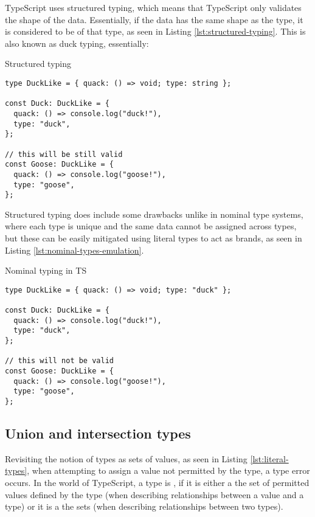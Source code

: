 TypeScript uses structured typing, which means that TypeScript only validates the shape of the data. Essentially, if the data has the same shape as the type, it is considered to be of that type, as seen in Listing \ref{lst:structured-typing}. This is also known as duck typing, essentially: 

\begin{listing}[h]
  \caption{Structured typing}\label{lst:structured-typing}
  \begin{verbatim}
type DuckLike = { quack: () => void; type: string };

const Duck: DuckLike = {
  quack: () => console.log("duck!"),
  type: "duck",
};

// this will be still valid
const Goose: DuckLike = {
  quack: () => console.log("goose!"),
  type: "goose",
};
\end{verbatim}
\end{listing}

Structured typing does include some drawbacks unlike in nominal type systems, where each type is unique and the same data cannot be assigned across types, but these can be easily mitigated using literal types to act as brands, as seen in Listing \ref{lst:nominal-types-emulation}.

\begin{listing}[h]
  \caption{Nominal typing in TS}\label{lst:nominal-types-emulation}
  \begin{verbatim}
type DuckLike = { quack: () => void; type: "duck" };

const Duck: DuckLike = {
  quack: () => console.log("duck!"),
  type: "duck",
};

// this will not be valid
const Goose: DuckLike = {
  quack: () => console.log("goose!"),
  type: "goose",
};
\end{verbatim}
\end{listing}

\subsection{Union and intersection types}

Revisiting the notion of types as sets of values, as seen in Listing \ref{lst:literal-types}, when attempting to assign a value not permitted by the  type, a type error occurs. In the world of TypeScript, a type is , if it is either a  the set of permitted values defined by the type (when describing relationships between a value and a type) or it is a  the sets (when describing relationships between two types).

